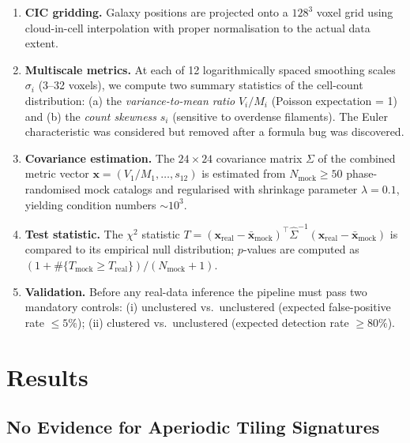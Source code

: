 \documentclass[12pt,a4paper]{article}
\begin{document}
\begin{enumerate}
  \item \textbf{CIC gridding.}  Galaxy positions are projected onto a $128^3$
        voxel grid using cloud-in-cell interpolation with proper normalisation to
        the actual data extent.

  \item \textbf{Multiscale metrics.}  At each of 12 logarithmically spaced
        smoothing scales $\sigma_i$ (3--32 voxels), we compute two summary
        statistics of the cell-count distribution: (a) the \emph{variance-to-mean
        ratio} $V_i/M_i$ (Poisson expectation = 1) and (b) the \emph{count
        skewness} $s_i$ (sensitive to overdense filaments).  The Euler
        characteristic was considered but removed after a formula bug was
        discovered.

  \item \textbf{Covariance estimation.}  The $24 \times 24$ covariance matrix
        $\Sigma$ of the combined metric vector
        $\mathbf{x} = (V_1/M_1, \ldots, s_{12})$
        is estimated from $N_\mathrm{mock} \geq 50$ phase-randomised mock
        catalogs and regularised with shrinkage parameter $\lambda = 0.1$,
        yielding condition numbers $\sim 10^3$.

  \item \textbf{Test statistic.}  The $\chi^2$ statistic
        $T = (\mathbf{x}_\mathrm{real} - \bar{\mathbf{x}}_\mathrm{mock})^\top
        \hat{\Sigma}^{-1}
        (\mathbf{x}_\mathrm{real} - \bar{\mathbf{x}}_\mathrm{mock})$
        is compared to its empirical null distribution; $p$-values are computed
        as $(1 + \#\{T_\mathrm{mock} \geq T_\mathrm{real}\}) / (N_\mathrm{mock}+1)$.

  \item \textbf{Validation.}  Before any real-data inference the pipeline must
        pass two mandatory controls: (i) unclustered vs.\ unclustered (expected
        false-positive rate $\leq 5\%$); (ii) clustered vs.\ unclustered
        (expected detection rate $\geq 80\%$).
\end{enumerate}

\section{Results}
\label{sec:results}

\subsection{No Evidence for Aperiodic Tiling Signatures}
\label{sec:notiling}
\end{document}
